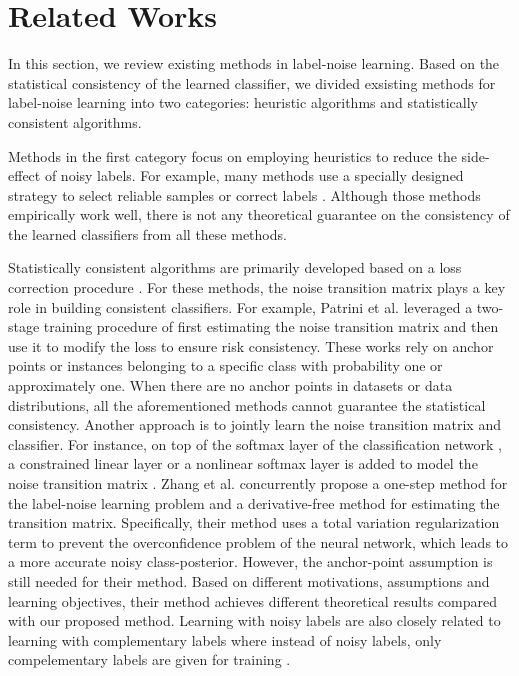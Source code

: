 \documentclass{article}
\begin{document}
\section{Related Works}
In this section, we review existing methods in label-noise learning. Based on the statistical consistency of the learned classifier, we divided
exsisting methods for label-noise learning into two categories: heuristic algorithms and statistically consistent algorithms. 

Methods in the first category focus on employing heuristics to reduce the side-effect of noisy labels. For example, many methods use a specially designed strategy to select reliable samples \cite{yu2019does,han2018co,malach2017decoupling,ren2018learning,jiang2018mentornet, yao2020searching} or correct labels \cite{ma2018dimensionality,kremer2018robust,tanaka2018joint,reed2014training}. Although those methods empirically work well, there is not any theoretical guarantee on the consistency of the learned classifiers from all these methods. 




Statistically consistent algorithms are primarily developed based on a loss correction procedure \cite{ liu2016classification, patrini2017making, zhang2018generalized}. For these methods, the noise transition matrix plays a key role in building consistent classifiers. For example, Patrini et al. leveraged a two-stage training procedure of first estimating the noise transition matrix and then use it to modify the loss to ensure risk consistency. These works rely on anchor points or instances belonging to a specific class with probability one or approximately one. When there are no anchor points in datasets or data distributions, all the aforementioned methods cannot guarantee the statistical consistency. Another approach is to jointly learn the noise transition matrix and classifier. For instance, on top of the softmax layer of the classification network \cite{goldberger2016training}, a constrained linear layer or a nonlinear softmax layer is added to model the noise transition matrix \cite{sukhbaatar2015training}. Zhang et al.  concurrently propose a one-step method for the label-noise learning problem and a derivative-free method for estimating the transition matrix. Specifically, their method uses a total variation regularization term to prevent the overconfidence problem of the neural network, which leads to a more accurate noisy class-posterior. However, the anchor-point assumption is still needed for their method. Based on different motivations, assumptions and learning objectives, their method achieves different theoretical results compared with our proposed method. Learning with noisy labels are also closely related to learning with complementary labels where instead of noisy labels, only compelementary labels are given for training \cite{yu2018learning, chou2020unbiased, feng2020learning}. 
\end{document}
